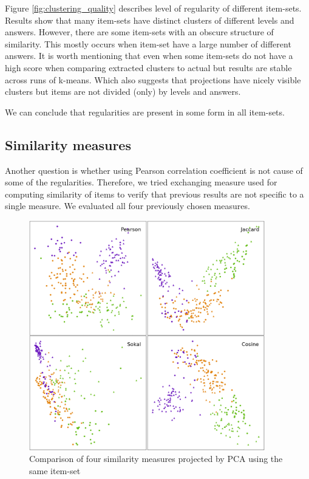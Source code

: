 \documentclass[
  digital, %
  table,   %
  nolof,     %
  nolot,     %
  nocover,
  color,
  final, %
]{fithesis3}
\begin{document}
Figure \ref{fig:clustering_quality} describes level of regularity of different item-sets. Results show that many item-sets have distinct clusters of different levels and answers. However, there are some item-sets with an obscure structure of similarity. This mostly occurs when item-set have a large number of different answers. It is worth mentioning that even when some item-sets do not have a high score when comparing extracted clusters to actual but results are stable across runs of k-means. Which also suggests that projections have nicely visible clusters but items are not divided (only) by levels and answers.


We can conclude that regularities are present in some form in all item-sets.


\subsection{Similarity measures}\label{evaluation-similarity-measures}

Another question is whether using Pearson correlation coefficient is not cause of some of the regularities. Therefore, we tried exchanging measure used for computing similarity of items to verify that previous results are not specific to a single measure. We evaluated all four previously chosen measures.

\begin{figure}
  \includegraphics[height=10cm]{img/measures}
  \caption{Comparison of four similarity measures projected by PCA using the same item-set}
  \label{fig:measures}
\end{figure}
\end{document}
